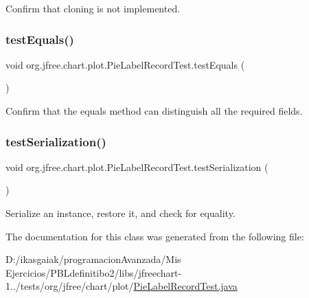 Confirm that cloning is not implemented. \mbox{\label{classorg_1_1jfree_1_1chart_1_1plot_1_1_pie_label_record_test_a5387be1531878686e042188ac766afbe}} 
\subsubsection{\texorpdfstring{test\+Equals()}{testEquals()}}
{\footnotesize\ttfamily void org.\+jfree.\+chart.\+plot.\+Pie\+Label\+Record\+Test.\+test\+Equals (\begin{DoxyParamCaption}{ }\end{DoxyParamCaption})}

Confirm that the equals method can distinguish all the required fields. \mbox{\label{classorg_1_1jfree_1_1chart_1_1plot_1_1_pie_label_record_test_a92fe7eefa7d3945584fa4c34ac527bc2}} 
\subsubsection{\texorpdfstring{test\+Serialization()}{testSerialization()}}
{\footnotesize\ttfamily void org.\+jfree.\+chart.\+plot.\+Pie\+Label\+Record\+Test.\+test\+Serialization (\begin{DoxyParamCaption}{ }\end{DoxyParamCaption})}

Serialize an instance, restore it, and check for equality. 

The documentation for this class was generated from the following file\+:\begin{DoxyCompactItemize}
\item 
D\+:/ikasgaiak/programacion\+Avanzada/\+Mis Ejercicios/\+P\+B\+Ldefinitibo2/libs/jfreechart-\/1../tests/org/jfree/chart/plot/\mbox{\hyperlink{_pie_label_record_test_8java}{Pie\+Label\+Record\+Test.\+java}}\end{DoxyCompactItemize}

